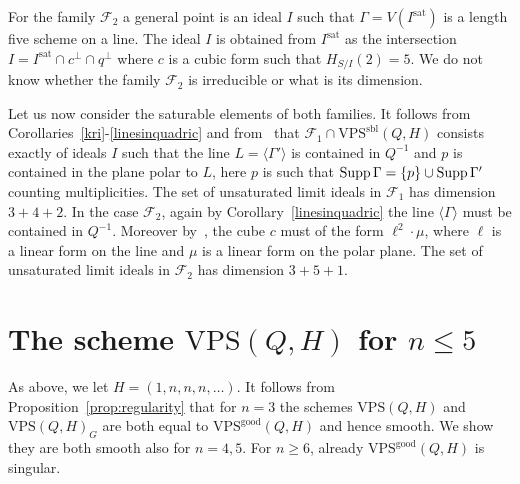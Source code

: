 \documentclass{amsart}
\newcommand{\Supp}{{\rm{Supp}}\,}
\newcommand{\VPSsbl}{{\mathrm{VPS}}^{\mathrm{sbl}}(Q, H)}
\newcommand{\VPSgood}{{\mathrm{VPS}}^{\mathrm{good}}(Q, H)}
\newcommand{\VPS}{\mathrm{VPS}(Q, H)}
\newcommand{\sat}{\mathrm{sat}}%
\begin{document}
For the family $\mathcal{F}_{2}$ a general point is an
ideal $I$ such that $\Gamma = V(I^{\sat})$ is a length five scheme on a line. The ideal $I$ is obtained from $I^{\sat}$ as the
intersection $I = I^{\sat} \cap c^{\perp} \cap q^\perp$ where $c$ is a cubic form such that $H_{S/I}(2) = 5$. We do not know
whether the family $\mathcal{F}_2$ is irreducible or what is its dimension.

Let us now consider the saturable elements of both families. It follows from
Corollaries~\ref{kri}-\ref{linesinquadric} and from~\cite[\S4.4.2]{JM} that $\mathcal{F}_1 \cap
\VPSsbl$ consists exactly of ideals $I$ such that the line $L = \langle \Gamma'\rangle$ is
contained in $Q^{-1}$ and $p$ is contained in the plane polar to $L$, here $p$
is such that $\Supp \Gamma = \{p\} \cup \Supp \Gamma'$ counting multiplicities. The set of unsaturated limit ideals in $\mathcal{F}_1$  has dimension $3+4+2$.
In the case $\mathcal{F}_2$, again by Corollary~\ref{linesinquadric} the line
$\langle \Gamma\rangle$ must be contained in $Q^{-1}$. Moreover
by~\cite[\S4.4.3]{JM}, the cube $c$
must of the form $\ell^2\cdot \mu$, where $\ell$ is a linear form on the
line and $\mu$ is a linear form on the polar plane. The set of unsaturated limit ideals in $\mathcal{F}_2$ has
dimension $3 + 5 + 1$.

\section{The scheme $\VPS$ for $n\leq 5$}

As above, we let $H = (1,n,n,n, \ldots)$.  
It follows from Proposition~\ref{prop:regularity} that for $n=3$ the schemes
$\VPS$ and $\VPS_G$ are both equal to $\VPSgood$ and hence smooth. We show
they are both smooth also for $n=4,5$. For $n\geq 6$, already $\VPSgood$ is singular.
\end{document}
